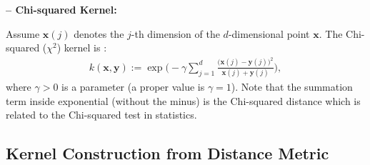 \documentclass[lang=cn,10pt]{gorgeousnbook}
\numberwithin{equation}{section}%
\numberwithin{figure}{section}%
\begin{document}
\textbf{-- Chi-squared Kernel:}

Assume $\boldsymbol{x}(j)$ denotes the $j$-th dimension of the $d$-dimensional point $\boldsymbol{x}$.
The Chi-squared ($\chi^2$) kernel is \cite{zhang2007local}:
\begin{align}
k(\boldsymbol{x}, \boldsymbol{y}) := \exp\Big(\!\!-\!\gamma \sum_{j=1}^d \frac{\big(\boldsymbol{x}(j) - \boldsymbol{y}(j)\big)^2}{\boldsymbol{x}(j) + \boldsymbol{y}(j)}\Big),
\end{align}
where $\gamma >0$ is a parameter (a proper value is $\gamma=1$). 
Note that the summation term inside exponential (without the minus) is the Chi-squared distance which is related to the Chi-squared test in statistics. 

\subsection{Kernel Construction from Distance Metric}
\end{document}

